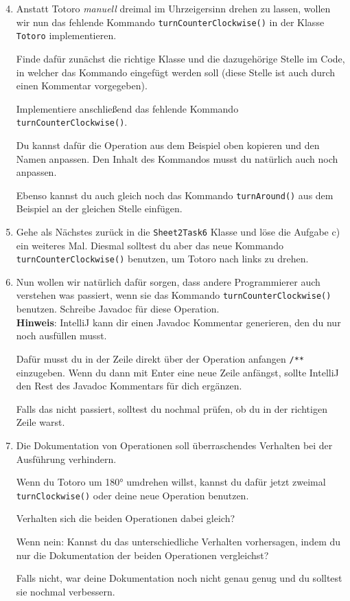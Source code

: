\begin{enumerate} \setcounter{enumi}{3}
    \item Anstatt Totoro \textit{manuell} dreimal im Uhrzeigersinn drehen zu lassen, wollen wir nun das fehlende Kommando \lstinline{turnCounterClockwise()} in der Klasse \lstinline{Totoro} implementieren.

    Finde dafür zunächst die richtige Klasse und die dazugehörige Stelle im Code, in welcher das Kommando eingefügt werden soll (diese Stelle ist auch durch einen Kommentar vorgegeben).
    
    Implementiere anschließend das fehlende Kommando \lstinline{turnCounterClockwise()}.
    
    Du kannst dafür die Operation aus dem Beispiel oben kopieren und den Namen anpassen.
    Den Inhalt des Kommandos musst du natürlich auch noch anpassen.
    
    Ebenso kannst du auch gleich noch das Kommando \lstinline{turnAround()} aus dem Beispiel an der gleichen Stelle einfügen.
    
    \item Gehe als Nächstes zurück in die \lstinline{Sheet2Task6} Klasse und löse die Aufgabe c) ein weiteres Mal.
    Diesmal solltest du aber das neue Kommando \lstinline{turnCounterClockwise()} benutzen, um Totoro nach links zu drehen.
\end{enumerate}





\begin{enumerate}\setcounter{enumi}{5}
    \item Nun wollen wir natürlich dafür sorgen, dass andere Programmierer auch verstehen was passiert, wenn sie das Kommando \lstinline{turnCounterClockwise()} benutzen.
    Schreibe Javadoc für diese Operation.\\
    
    \textbf{Hinweis}: IntelliJ kann dir einen Javadoc Kommentar generieren, den du nur noch ausfüllen musst.
    
    Dafür musst du in der Zeile direkt über der Operation anfangen \lstinline{/**} einzugeben.
    Wenn du dann mit Enter eine neue Zeile anfängst, sollte IntelliJ den Rest des Javadoc Kommentars für dich ergänzen.
    
    Falls das nicht passiert, solltest du nochmal prüfen, ob du in der richtigen Zeile warst.
    
    \item Die Dokumentation von Operationen soll überraschendes Verhalten bei der Ausführung verhindern.
    
    Wenn du Totoro um 180° umdrehen willst, kannst du dafür jetzt zweimal \lstinline{turnClockwise()} oder deine neue Operation benutzen.
    
    Verhalten sich die beiden Operationen dabei gleich?
    
    Wenn nein: Kannst du das unterschiedliche Verhalten vorhersagen, indem du nur die Dokumentation der beiden Operationen vergleichst?
    
    Falls nicht, war deine Dokumentation noch nicht genau genug und du solltest sie nochmal verbessern.
\end{enumerate}


